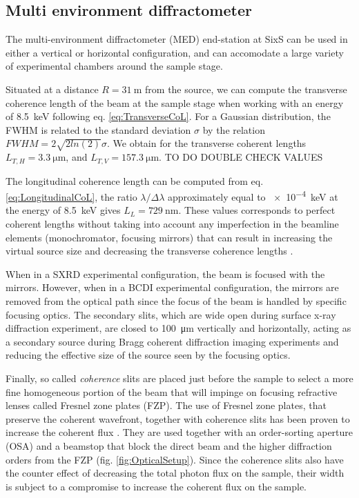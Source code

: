 \subsection{Multi environment diffractometer}

The multi-environment diffractometer (MED) end-station at SixS can be used in either a vertical or horizontal configuration, and can accomodate a large variety of experimental chambers around the sample stage.

Situated at a distance $R = \qty{31}{\m}$ from the source, we can compute the transverse coherence length of the beam at the sample stage when working with an energy of \qty{8.5}{\keV} following eq. \ref{eq:TransverseCoL}.
For a Gaussian distribution, the FWHM is related to the standard deviation $\sigma$ by the relation $FWHM = 2\sqrt{2 ln (2) } \sigma$.
We obtain for the transverse coherent lengths $L_{T,H} = \qty{3.3}{\um}$, and $L_{T,V} = \qty{157.3}{\um}$.
TO DO DOUBLE CHECK VALUES

The longitudinal coherence length can be computed from eq. \ref{eq:LongitudinalCoL}, the ratio $\lambda/\Delta\lambda$ approximately equal to \qty{e-4}{\keV} at the energy of \qty{8.5}{\keV} gives $L_L = \qty{729}{\nm}$.
These values corresponds to perfect coherent lengths without taking into account any imperfection in the beamline elements (monochromator, focusing mirrors) that can result in increasing the virtual source size and decreasing the transverse coherence lengths \parencite{vincentjacques2010}.

When in a SXRD experimental configuration, the beam is focused with the mirrors.
However, when in a BCDI experimental configuration, the mirrors are removed from the optical path since the focus of the beam is handled by specific focusing optics.
The secondary slits, which are wide open during surface x-ray diffraction experiment, are closed to \qty{100}{\um} vertically and horizontally, acting as a secondary source during Bragg coherent diffraction imaging experiments and reducing the effective size of the source seen by the focusing optics.

Finally, so called \textit{coherence} slits are placed just before the sample to select a more fine homogeneous portion of the beam that will impinge on focusing refractive lenses called Fresnel zone plates (FZP).
The use of Fresnel zone plates, that preserve the coherent wavefront, together with coherence slits has been proven to increase the coherent flux \parencite{Schroer2008, diaz_coherent_2009, Mastropietro2011}.
They are used together with an order-sorting aperture (OSA) and a beamstop that block the direct beam and the higher diffraction orders from the FZP (fig. \ref{fig:OpticalSetup}).
Since the coherence slits also have the counter effect of decreasing the total photon flux on the sample, their width is subject to a compromise to increase the coherent flux on the sample.

